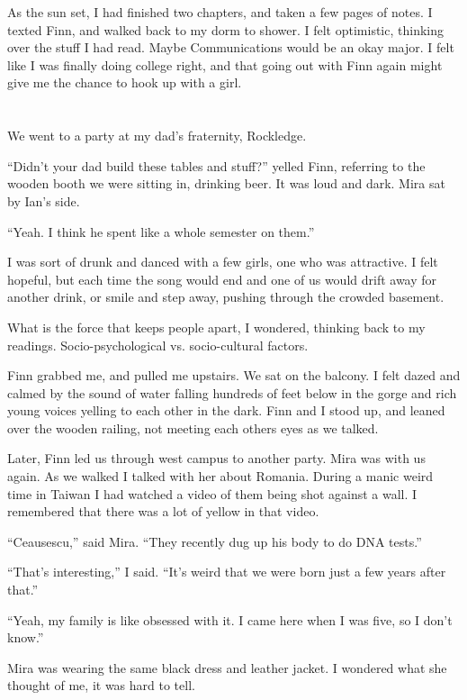 As the sun set, I had finished two chapters, and taken a few pages of notes.  I
texted Finn, and walked back to my dorm to shower.  I felt optimistic, thinking
over the stuff I had read.  Maybe Communications would be an okay major.  I felt
like I was finally doing college right, and that going out with Finn again might
give me the chance to hook up with a girl.

\section{}

We went to a party at my dad's fraternity, Rockledge.  

``Didn't your dad build these tables and stuff?'' yelled Finn, referring to the
wooden booth we were sitting in, drinking beer.  It was loud and dark.  Mira sat by
Ian's side.  

``Yeah.  I think he spent like a whole semester on them.''

I was sort of drunk and danced with a few girls, one who was attractive.  I felt
hopeful, but each time the song would end and one of us would drift away for
another drink, or smile and step away, pushing through the crowded basement.  

What is the force that keeps people apart, I wondered, thinking back to my
readings.  Socio-psychological vs. socio-cultural factors. 

Finn grabbed me, and pulled me upstairs.  We sat on the balcony.  I felt dazed
and calmed by the sound of water falling hundreds of feet below in the gorge and
rich young voices yelling to each other in the dark.  Finn and I stood up, and
leaned over the wooden railing, not meeting each others eyes as we talked.

Later, Finn led us through west campus to another party.  Mira was with us
again.  As we walked I talked with her about Romania.  During a manic weird time
in Taiwan I had watched a video of them being shot against a wall.  I remembered
that there was a lot of yellow in that video.  

``Ceausescu,'' said Mira.  ``They recently dug up his body to do DNA tests.''  

``That's interesting,'' I said.  ``It's weird that we were born just a few years
after that.''  

``Yeah, my family is like obsessed with it.  I came here when I was five, so I
don't know.''

Mira was wearing the same black dress and leather jacket.  I wondered what she
thought of me, it was hard to tell.


